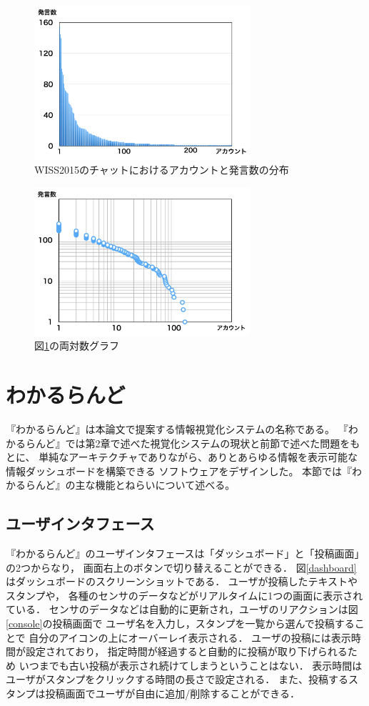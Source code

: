 \begin{figure}[H]
\centering\includegraphics[width=8cm]{images/wisschat.png}
\caption{WISS2015のチャットにおけるアカウントと発言数の分布}
\label{wisschat}
\end{figure}

\begin{figure}[H]
\centering\includegraphics[width=8cm]{images/powerlaw.png}
\caption{図\ref{wisschat}の両対数グラフ}
\label{powerlaw}
\end{figure}


\section{わかるらんど}

『わかるらんど』は本論文で提案する情報視覚化システムの名称である。
『わかるらんど』では第2章で述べた視覚化システムの現状と前節で述べた問題をもとに、
単純なアーキテクチャでありながら、ありとあらゆる情報を表示可能な情報ダッシュボードを構築できる
ソフトウェアをデザインした。
本節では『わかるらんど』の主な機能とねらいについて述べる。

\subsection{ユーザインタフェース}
『わかるらんど』のユーザインタフェースは「ダッシュボード」と「投稿画面」の2つからなり，
画面右上のボタンで切り替えることができる．
図\ref{dashboard}はダッシュボードのスクリーンショットである．
ユーザが投稿したテキストやスタンプや，
各種のセンサのデータなどがリアルタイムに1つの画面に表示されている．
センサのデータなどは自動的に更新され，ユーザのリアクションは図\ref{console}の投稿画面で
ユーザ名を入力し，スタンプを一覧から選んで投稿することで
自分のアイコンの上にオーバーレイ表示される．
ユーザの投稿には表示時間が設定されており，
指定時間が経過すると自動的に投稿が取り下げられるため
いつまでも古い投稿が表示され続けてしまうということはない．
表示時間はユーザがスタンプをクリックする時間の長さで設定される．
また、投稿するスタンプは投稿画面でユーザが自由に追加/削除することができる．

